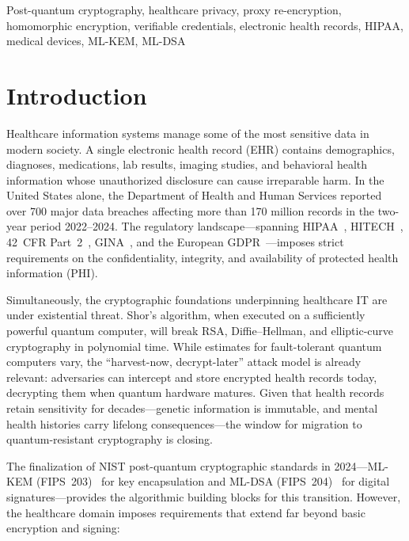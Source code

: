 \documentclass[conference,10pt]{IEEEtran}
\newcommand{\mlkem}{\textsf{ML-KEM}}
\newcommand{\mldsa}{\textsf{ML-DSA}}
\begin{document}
\begin{IEEEkeywords}
Post-quantum cryptography, healthcare privacy, proxy re-encryption, homomorphic encryption, verifiable credentials, electronic health records, HIPAA, medical devices, ML-KEM, ML-DSA
\end{IEEEkeywords}

\section{Introduction}

Healthcare information systems manage some of the most sensitive data in modern society. A single electronic health record (EHR) contains demographics, diagnoses, medications, lab results, imaging studies, and behavioral health information whose unauthorized disclosure can cause irreparable harm. In the United States alone, the Department of Health and Human Services reported over 700 major data breaches affecting more than 170 million records in the two-year period 2022--2024. The regulatory landscape---spanning HIPAA~\cite{hipaa1996}, HITECH~\cite{hitech2009}, 42~CFR Part~2~\cite{cfr42part2}, GINA~\cite{gina2008}, and the European GDPR~\cite{gdpr2016}---imposes strict requirements on the confidentiality, integrity, and availability of protected health information (PHI).

Simultaneously, the cryptographic foundations underpinning healthcare IT are under existential threat. Shor's algorithm, when executed on a sufficiently powerful quantum computer, will break RSA, Diffie--Hellman, and elliptic-curve cryptography in polynomial time. While estimates for fault-tolerant quantum computers vary, the ``harvest-now, decrypt-later'' attack model is already relevant: adversaries can intercept and store encrypted health records today, decrypting them when quantum hardware matures. Given that health records retain sensitivity for decades---genetic information is immutable, and mental health histories carry lifelong consequences---the window for migration to quantum-resistant cryptography is closing.

The finalization of NIST post-quantum cryptographic standards in 2024---\mlkem{} (FIPS~203)~\cite{fips203} for key encapsulation and \mldsa{} (FIPS~204)~\cite{fips204} for digital signatures---provides the algorithmic building blocks for this transition. However, the healthcare domain imposes requirements that extend far beyond basic encryption and signing:
\end{document}

